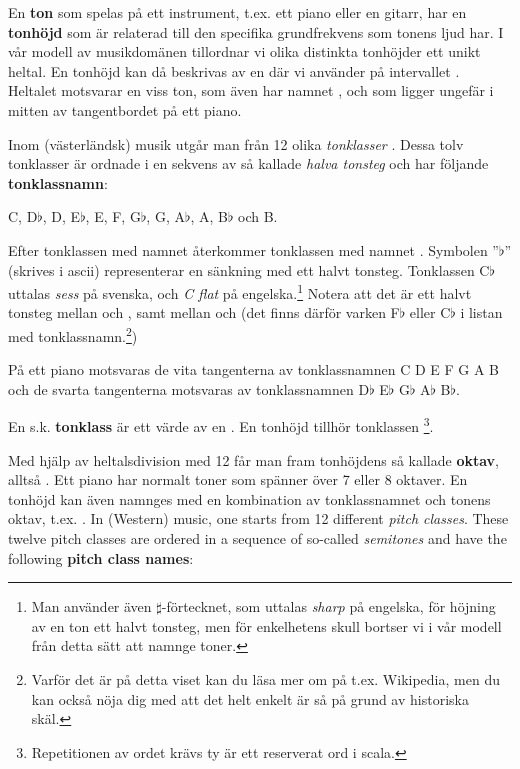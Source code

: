 En \textbf{ton}  som spelas på ett instrument, t.ex. ett piano eller en gitarr, har en \textbf{tonhöjd}  som är relaterad till den specifika  grundfrekvens som tonens ljud har. I vår modell av musikdomänen tillordnar vi olika distinkta tonhöjder ett unikt heltal. En tonhöjd kan då beskrivas av en  där vi använder  på intervallet . Heltalet  motsvarar en viss ton, som även har namnet  , och som ligger ungefär i mitten av tangentbordet på ett piano.

\ifswedish
Inom (västerländsk) musik utgår man från 12 olika \emph{tonklasser} .
Dessa tolv tonklasser är ordnade i en sekvens av så kallade \emph{halva tonsteg} och har följande \textbf{tonklassnamn}:

C, D$\flat$, D, E$\flat$, E, F, G$\flat$, G, A$\flat$, A, B$\flat$ och B.

Efter tonklassen med namnet  återkommer tonklassen med namnet .
Symbolen ''$\flat$'' (skrives  i ascii) representerar en sänkning med ett halvt tonsteg. Tonklassen C$\flat$ uttalas \emph{sess} på svenska, och \emph{C flat} på engelska.\footnote{Man använder även $\sharp$-förtecknet, som uttalas \emph{sharp} på engelska, för höjning av en ton ett halvt tonsteg, men för enkelhetens skull bortser vi i vår modell från detta sätt att namnge toner.}
Notera att det är ett halvt tonsteg mellan  och , samt mellan  och  (det finns därför varken F$\flat$ eller C$\flat$ i listan med tonklassnamn.\footnote{Varför det är på detta viset kan du läsa mer om på t.ex. Wikipedia, men du kan också nöja dig med att det helt enkelt är så på grund av historiska skäl.})

På ett piano motsvaras de vita tangenterna av tonklassnamnen C D E F G A B och de svarta tangenterna motsvaras av tonklassnamnen D$\flat$ E$\flat$ G$\flat$ A$\flat$ B$\flat$.

En s.k. \textbf{tonklass} är ett värde av en .
En tonhöjd  tillhör tonklassen \footnote{Repetitionen av ordet  krävs ty  är ett reserverat ord i scala.}.

Med hjälp av heltalsdivision med 12 får man fram tonhöjdens så kallade \textbf{oktav}, alltså . Ett piano har normalt toner som spänner över 7 eller 8 oktaver.
En tonhöjd kan även namnges med en kombination av tonklassnamnet och tonens oktav, t.ex. .
\else
In (Western) music, one starts from 12 different \emph{pitch classes}.
These twelve pitch classes are ordered in a sequence of so-called \emph{semitones} and have the following \textbf{pitch class names}:

